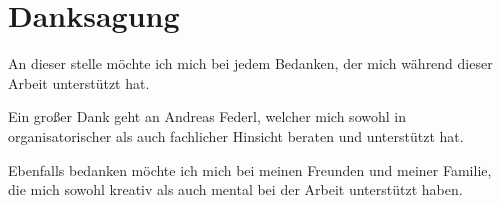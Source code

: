 \section*{Danksagung}

An dieser stelle möchte ich mich bei jedem Bedanken, der mich während dieser Arbeit unterstützt hat. 


Ein großer Dank geht an Andreas Federl, welcher mich sowohl in organisatorischer als auch fachlicher Hinsicht beraten und unterstützt hat.

Ebenfalls bedanken möchte ich mich bei meinen Freunden und meiner Familie, die mich sowohl kreativ als auch mental bei der Arbeit unterstützt haben.